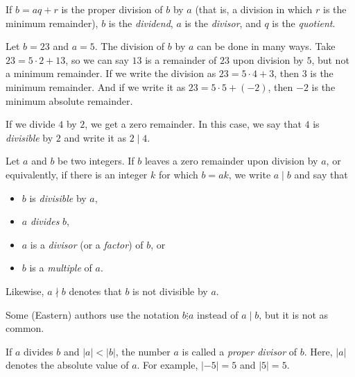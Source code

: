 \documentclass{subfile}
\begin{document}

	\begin{definition}
		If $b=aq+r$ is the proper division of $b$ by $a$ (that is, a division in which $r$ is the minimum remainder), $b$ is the \textit{dividend}, $a$ is the \textit{divisor}, and $q$ is the \textit{quotient}.
	\end{definition}

	\begin{example}
		Let $b=23$ and $a=5$. The division of $b$ by $a$ can be done in many ways. Take $23=5\cdot2+13$, so we can say $13$ is a remainder of $23$ upon division by $5$, but not a minimum remainder. If we write the division as $23=5\cdot4+3$, then $3$ is the minimum remainder. And if we write it as $23=5\cdot5+(-2)$, then $-2$ is the minimum absolute remainder.
	\end{example}

	If we divide $4$ by $2$, we get a zero remainder. In this case, we say that $4$ is \textit{divisible} by $2$ and write it as $2\mid 4$.

	\begin{definition}
		Let $a$ and $b$ be two integers. If $b$ leaves a zero remainder upon division by $a$, or equivalently, if there is an integer $k$ for which $b=ak$, we write $a \mid b$ and say that
		\begin{itemize}
			\item $b$ is \textit{divisible} by $a$,
			\item $a$ \textit{divides} $b$,
			\item $a$ is a \textit{divisor} (or a \textit{factor}) of $b$, or
			\item $b$ is a \textit{multiple} of $a$.
		\end{itemize}
		Likewise, $a\nmid b$ denotes that $b$ is not divisible by $a$.
	\end{definition}

	\begin{remark}
		Some (Eastern) authors use the notation $b\vdots a$ instead of $a\mid b$, but it is not as common.
	\end{remark}

	\begin{definition}
		If $a$ divides $b$ and $|a|<|b|$, the number $a$ is called a \textit{proper divisor} of $b$. Here, $|a|$ denotes the absolute value of $a$. For example, $|-5|=5$ and $|5|=5$.
	\end{definition}
\end{document}

